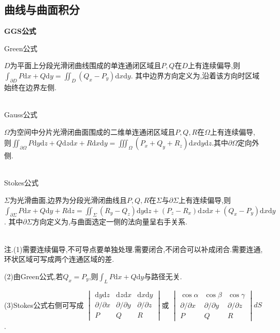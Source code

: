 \documentclass[UTF8]{ctexart}
\begin{document}
\subsection{曲线与曲面积分}

\noindent \textbf{GGS公式} \par 
\noindent Green公式\par 
$D$为平面上分段光滑闭曲线围成的单连通闭区域且$P,Q$在$D$上有连续偏导,则$\int _{\partial D}P\mathrm{d}x+Q\mathrm{d}y=\iint_D (Q_x-P_y)\mathrm{d}x\mathrm{d}y$.
其中边界方向定义为,沿着该方向时区域始终在边界左侧.\par 
~\\
\noindent Gauss公式\par 
$\Omega$为空间中分片光滑闭曲面围成的二维单连通闭区域且$P,Q,R$在$\Omega $上有连续偏导,
则$\iint _{\partial \Omega}P\mathrm{d}y\mathrm{d}z+Q\mathrm{d}z\mathrm{d}x+R\mathrm{d}x\mathrm{d}y=
\iiint_{\Omega} (P_x+Q_y+R_z)\mathrm{d}x\mathrm{d}y\mathrm{d}z$.其中$\partial \Omega$定向外侧. \par 
~\\
\noindent Stokes公式\par 
$\Sigma $为光滑曲面,边界为分段光滑闭曲线且$P,Q,R$在$\Sigma$与$\partial \Sigma$上有连续偏导,则
$\int _{\partial \Sigma}P\mathrm{d}x+Q\mathrm{d}y+R\mathrm{d}z=
\iint_{\Sigma} (R_y-Q_z)\mathrm{d}y\mathrm{d}z+(P_z-R_x)\mathrm{d}z\mathrm{d}x+(Q_x-P_y)\mathrm{d}x\mathrm{d}y$.
其中$\partial \Sigma$方向定义为,与曲面选定一侧的法向量呈右手关系. \par
~\\
\noindent 注.\quad (1)需要连续偏导,不可导点要单独处理.需要闭合,不闭合可以补成闭合.需要连通,环状区域可写成两个连通区域的差.\par 
(2)由Green公式,若$Q_x=P_y$,则$\int _L P \mathrm{d}x+Q \mathrm{d}y$与路径无关.\par
(3)Stokes公式右侧可写成
$\begin{vmatrix}\mathrm{d}y\mathrm{d}z&\mathrm{d}z\mathrm{d}x&\mathrm{d}x\mathrm{d}y\\\partial/\partial x&\partial/\partial y&\partial/\partial z\\P&Q&R\end{vmatrix}$或
$\begin{vmatrix}\cos\alpha &\cos\beta &\cos\gamma \\\partial/\partial x&\partial/\partial y&\partial/\partial z
\\P&Q&R \end{vmatrix}dS$.\par 
\end{document}
